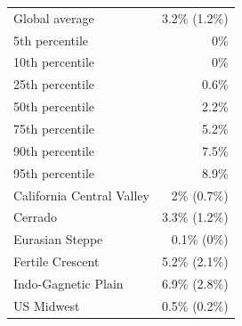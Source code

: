 
\begin{tabular}{lr}
\toprule
Global average & 3.2\% (1.2\%)\\
5th percentile & 0\%\\
10th percentile & 0\%\\
25th percentile & 0.6\%\\
50th percentile & 2.2\%\\
\addlinespace
75th percentile & 5.2\%\\
90th percentile & 7.5\%\\
95th percentile & 8.9\%\\
California Central Valley & 2\% (0.7\%)\\
Cerrado & 3.3\% (1.2\%)\\
\addlinespace
Eurasian Steppe & 0.1\% (0\%)\\
Fertile Crescent & 5.2\% (2.1\%)\\
Indo-Gagnetic Plain & 6.9\% (2.8\%)\\
US Midwest & 0.5\% (0.2\%)\\
\bottomrule
\end{tabular}
